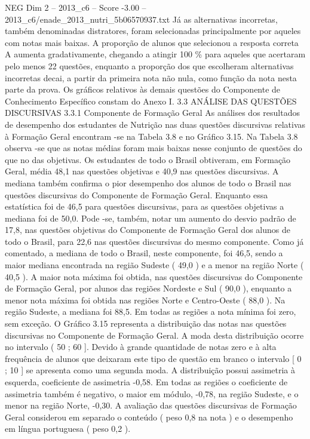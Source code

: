 \begin{textsample}{NEG Dim 2 – 2013\_c6 – Score -3.00 – 2013\_c6/enade\_2013\_nutri\_5b06570937.txt}
Já as alternativas incorretas, também denominadas distratores, foram selecionadas principalmente por aqueles com notas mais baixas.
A proporção de alunos que selecionou a resposta correta A aumenta gradativamente, chegando a atingir 100 \% para aqueles que acertaram pelo menos 22 questões, enquanto a proporção dos que escolheram alternativas incorretas decai, a partir da primeira nota não nula, como função da nota nesta parte da prova.
Os gráficos relativos às demais questões do Componente de Conhecimento Específico constam do Anexo I. 3.3 ANÁLISE DAS QUESTÕES DISCURSIVAS 3.3.1 Componente de Formação Geral As análises dos resultados de desempenho dos estudantes de Nutrição nas duas questões discursivas relativas à Formação Geral encontram -se na Tabela 3.8 e no Gráfico 3.15.
Na Tabela 3.8 observa -se que as notas médias foram mais baixas nesse conjunto de questões do que no das objetivas.
Os estudantes de todo o Brasil obtiveram, em Formação Geral, média 48,1 nas questões objetivas e 40,9 nas questões discursivas.
A mediana também confirma o pior desempenho dos alunos de todo o Brasil nas questões discursivas do Componente de Formação Geral.
Enquanto essa estatística foi de 46,5 para questões discursivas, para as questões objetivas a mediana foi de 50,0.
Pode -se, também, notar um aumento do desvio padrão de 17,8, nas questões objetivas do Componente de Formação Geral dos alunos de todo o Brasil, para 22,6 nas questões discursivas do mesmo componente.
Como já comentado, a mediana de todo o Brasil, neste componente, foi 46,5, sendo a maior mediana encontrada na região Sudeste ( 49,0 ) e a menor na região Norte ( 40,5 ).
A maior nota máxima foi obtida, nas questões discursivas do Componente de Formação Geral, por alunos das regiões Nordeste e Sul ( 90,0 ), enquanto a menor nota máxima foi obtida nas regiões Norte e Centro-Oeste ( 88,0 ).
Na região Sudeste, a mediana foi 88,5.
Em todas as regiões a nota mínima foi zero, sem exceção.
O Gráfico 3.15 representa a distribuição das notas nas questões discursivas no Componente de Formação Geral.
A moda desta distribuição ocorre no intervalo ( 50 ; 60 ].
Devido à grande quantidade de notas zero e à alta frequência de alunos que deixaram este tipo de questão em branco o intervalo [ 0 ; 10 ] se apresenta como uma segunda moda.
A distribuição possui assimetria à esquerda, coeficiente de assimetria -0,58.
Em todas as regiões o coeficiente de assimetria também é negativo, o maior em módulo, -0,78, na região Sudeste, e o menor na região Norte, -0,30.
A avaliação das questões discursivas de Formação Geral considerou em separado o conteúdo ( peso 0,8 na nota ) e o desempenho em língua portuguesa ( peso 0,2 ).

\end{textsample}
